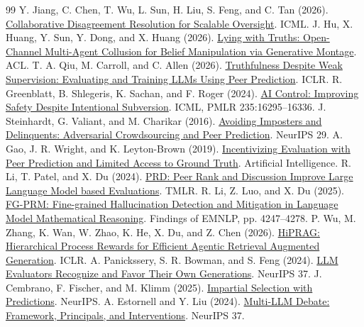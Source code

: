 \documentclass[11pt,letterpaper]{article}
\begin{document}
\begin{thebibliography}{99}
 Y. Jiang, C. Chen, T. Wu, L. Sun, H. Liu, S. Feng, and C. Tan (2026). \href{https://arxiv.org/abs/2607.01251}{Collaborative Disagreement Resolution for Scalable Oversight}. ICML.
 J. Hu, X. Huang, Y. Sun, Y. Dong, and X. Huang (2026). \href{https://arxiv.org/abs/2601.01685}{Lying with Truths: Open-Channel Multi-Agent Collusion for Belief Manipulation via Generative Montage}. ACL.
 T. A. Qiu, M. Carroll, and C. Allen (2026). \href{https://arxiv.org/abs/2601.20299}{Truthfulness Despite Weak Supervision: Evaluating and Training LLMs Using Peer Prediction}. ICLR.
 R. Greenblatt, B. Shlegeris, K. Sachan, and F. Roger (2024). \href{https://arxiv.org/abs/2312.06942}{AI Control: Improving Safety Despite Intentional Subversion}. ICML, PMLR 235:16295--16336.
 J. Steinhardt, G. Valiant, and M. Charikar (2016). \href{https://arxiv.org/abs/1606.05374}{Avoiding Imposters and Delinquents: Adversarial Crowdsourcing and Peer Prediction}. NeurIPS 29.
 A. Gao, J. R. Wright, and K. Leyton-Brown (2019). \href{https://doi.org/10.1016/j.artint.2019.03.004}{Incentivizing Evaluation with Peer Prediction and Limited Access to Ground Truth}. Artificial Intelligence.
 R. Li, T. Patel, and X. Du (2024). \href{https://openreview.net/forum?id=YVD1QqWRaj}{PRD: Peer Rank and Discussion Improve Large Language Model based Evaluations}. TMLR.
 R. Li, Z. Luo, and X. Du (2025). \href{https://aclanthology.org/2025.findings-emnlp.228/}{FG-PRM: Fine-grained Hallucination Detection and Mitigation in Language Model Mathematical Reasoning}. Findings of EMNLP, pp. 4247--4278.
 P. Wu, M. Zhang, K. Wan, W. Zhao, K. He, X. Du, and Z. Chen (2026). \href{https://proceedings.iclr.cc/paper_files/paper/2026/hash/85255cf8f2d2318cc7cffd0b1bc66625-Abstract-Conference.html}{HiPRAG: Hierarchical Process Rewards for Efficient Agentic Retrieval Augmented Generation}. ICLR.
 A. Panickssery, S. R. Bowman, and S. Feng (2024). \href{https://arxiv.org/abs/2404.13076}{LLM Evaluators Recognize and Favor Their Own Generations}. NeurIPS 37.
 J. Cembrano, F. Fischer, and M. Klimm (2025). \href{https://arxiv.org/abs/2510.19002}{Impartial Selection with Predictions}. NeurIPS.
 A. Estornell and Y. Liu (2024). \href{https://proceedings.nips.cc/paper_files/paper/2024/file/32e07a110c6c6acf1afbf2bf82b614ad-Paper-Conference.pdf}{Multi-LLM Debate: Framework, Principals, and Interventions}. NeurIPS 37.

\end{thebibliography}
\end{document}
